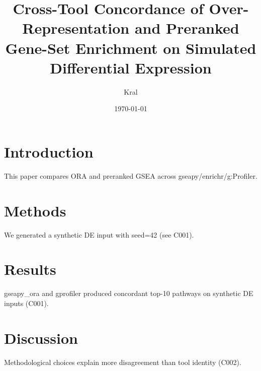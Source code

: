 \documentclass{article}
\title{Cross-Tool Concordance of Over-Representation and Preranked Gene-Set Enrichment on Simulated Differential Expression}
\author{Kral}
\date{\today}
\begin{document}
\maketitle
\section{Introduction}
This paper compares ORA and preranked GSEA across gseapy/enrichr/g:Profiler.
\section{Methods}
We generated a synthetic DE input with seed=42 (see C001).
\section{Results}
gseapy_ora and gprofiler produced concordant top-10 pathways on synthetic DE inputs (C001).
\section{Discussion}
Methodological choices explain more disagreement than tool identity (C002).

\end{document}
